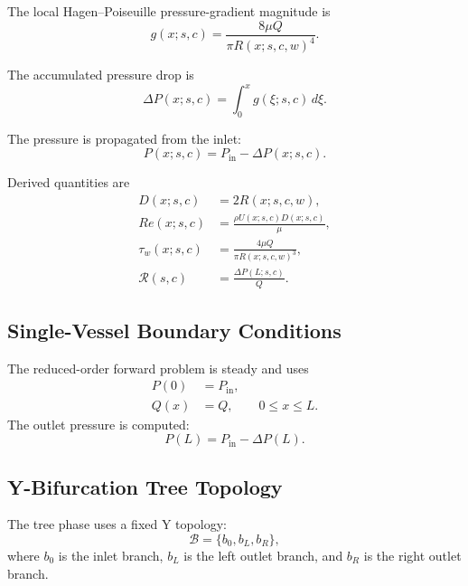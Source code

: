 \documentclass[11pt]{article}
\begin{document}
The local Hagen--Poiseuille pressure-gradient magnitude is
\begin{equation}
    g(x;s,c)
    =
    \frac{8\mu Q}{\pi R(x;s,c,w)^4}.
\end{equation}

The accumulated pressure drop is
\begin{equation}
    \Delta P(x;s,c)
    =
    \int_{0}^{x}
    g(\xi;s,c)\,d\xi.
\end{equation}

The pressure is propagated from the inlet:
\begin{equation}
    P(x;s,c)
    =
    P_{\mathrm{in}}
    -
    \Delta P(x;s,c).
\end{equation}

Derived quantities are
\begin{align}
    D(x;s,c) &= 2R(x;s,c,w),\\
    Re(x;s,c) &=
    \frac{\rho U(x;s,c)D(x;s,c)}{\mu},\\
    \tau_w(x;s,c) &=
    \frac{4\mu Q}{\pi R(x;s,c,w)^3},\\
    \mathcal{R}(s,c) &=
    \frac{\Delta P(L;s,c)}{Q}.
\end{align}

\subsection{Single-Vessel Boundary Conditions}

The reduced-order forward problem is steady and uses
\begin{align}
    P(0) &= P_{\mathrm{in}},\\
    Q(x) &= Q,\qquad 0\le x\le L.
\end{align}
The outlet pressure is computed:
\begin{equation}
    P(L)
    =
    P_{\mathrm{in}}
    -
    \Delta P(L).
\end{equation}

\subsection{Y-Bifurcation Tree Topology}

The tree phase uses a fixed Y topology:
\begin{equation}
    \mathcal{B}
    =
    \{b_0,b_L,b_R\},
\end{equation}
where $b_0$ is the inlet branch, $b_L$ is the left outlet branch, and $b_R$ is the right outlet branch.
\end{document}

